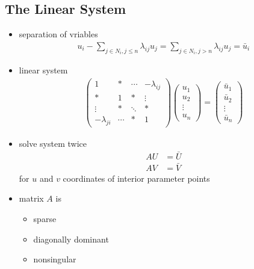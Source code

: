 \subsection{The Linear System}
\begin{itemize}
    \item separation of vriables
    \begin{align*}
        u_i-\sum_{j\in N_i, j\le n}\lambda_{ij}u_j=\sum_{j\in N_i, j> n}\lambda_{ij}u_j=\bar{u}_i
    \end{align*}
    \item linear system
    \begin{align*}
        \begin{pmatrix}
            1 & * & \cdots & -\lambda_{ij}\\
            * & 1 & * & \vdots\\
            \vdots & * & \ddots & *\\
            -\lambda_{ji} & \cdots & * & 1
        \end{pmatrix}\begin{pmatrix}
            u_1 \\ u_2 \\ \vdots \\ u_n
        \end{pmatrix}=\begin{pmatrix}
            \bar{u}_1 \\ \bar{u}_2 \\ \vdots \\ \bar{u}_n
        \end{pmatrix}
    \end{align*}
    \item solve system twice
    \begin{align*}
        AU&=\bar{U}\\
        AV&=\bar{V}
    \end{align*}
    for $u$ and $v$ coordinates of interior parameter points
    \item matrix $A$ is 
    \begin{itemize}
        \item sparse
        \item diagonally dominant
        \item nonsingular
    \end{itemize}
\end{itemize}


